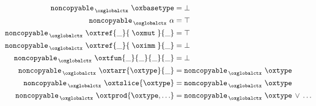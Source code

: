 \begin{align*}
  \texttt{noncopyable}_{\,\oxglobalctx} \  \oxbasetype &= \bot \\
  \texttt{noncopyable}_{\,\oxglobalctx} \  \alpha &= \top \\
  \texttt{noncopyable}_{\,\oxglobalctx} \  \oxtref{\_}{\;\oxmut\;}{\_} &= \top \\
  \texttt{noncopyable}_{\,\oxglobalctx} \  \oxtref{\_}{\;\oximm\;}{\_} &= \bot \\
  \texttt{noncopyable}_{\,\oxglobalctx} \  \oxtfun{\_}{\_}{\_}{\_} &= \bot \\
  \texttt{noncopyable}_{\,\oxglobalctx} \  \oxtarr{\oxtype}{\_} &= \texttt{noncopyable}_{\,\oxglobalctx} \  \oxtype \\
  \texttt{noncopyable}_{\,\oxglobalctx} \  \oxtslice{\oxtype} &= \texttt{noncopyable}_{\,\oxglobalctx} \  \oxtype \\
  \texttt{noncopyable}_{\,\oxglobalctx} \  \oxtprod{\oxtype, \ldots} &= \texttt{noncopyable}_{\,\oxglobalctx} \  \oxtype \, \vee \,  \ldots \\
\end{align*}
